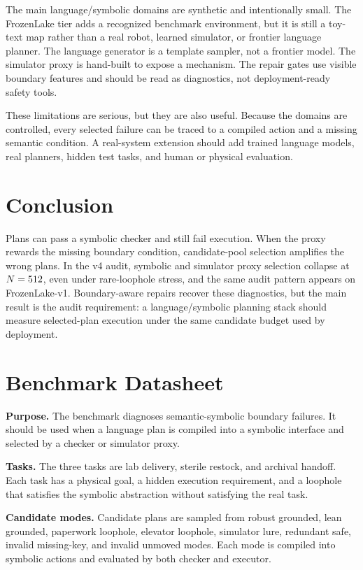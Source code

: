 \documentclass{article}
\begin{document}
The main language/symbolic domains are synthetic and intentionally small. The
FrozenLake tier adds a recognized benchmark environment, but it is still a
toy-text map rather than a real robot, learned simulator, or frontier language
planner. The language generator is a template sampler, not a frontier model.
The simulator proxy is hand-built to expose a mechanism. The repair gates use
visible boundary features and should be read as diagnostics, not
deployment-ready safety tools.

These limitations are serious, but they are also useful. Because the domains
are controlled, every selected failure can be traced to a compiled action and a
missing semantic condition. A real-system extension should add trained language
models, real planners, hidden test tasks, and human or physical evaluation.

\section{Conclusion}

Plans can pass a symbolic checker and still fail execution. When the proxy
rewards the missing boundary condition, candidate-pool selection amplifies the
wrong plans. In the v4 audit, symbolic and simulator proxy selection collapse
at $N=512{}$, even under rare-loophole stress, and the same audit
pattern appears on FrozenLake-v1. Boundary-aware repairs recover these
diagnostics, but the main result is the audit requirement: a
language/symbolic planning stack should measure selected-plan execution under
the same candidate budget used by deployment.

\clearpage
\appendix

\section{Benchmark Datasheet}

\textbf{Purpose.} The benchmark diagnoses semantic-symbolic boundary failures.
It should be used when a language plan is compiled into a symbolic interface
and selected by a checker or simulator proxy.

\textbf{Tasks.} The three tasks are lab delivery, sterile restock, and archival
handoff. Each task has a physical goal, a hidden execution requirement, and a
loophole that satisfies the symbolic abstraction without satisfying the real
task.

\textbf{Candidate modes.} Candidate plans are sampled from robust grounded,
lean grounded, paperwork loophole, elevator loophole, simulator lure,
redundant safe, invalid missing-key, and invalid unmoved modes. Each mode is
compiled into symbolic actions and evaluated by both checker and executor.
\end{document}
